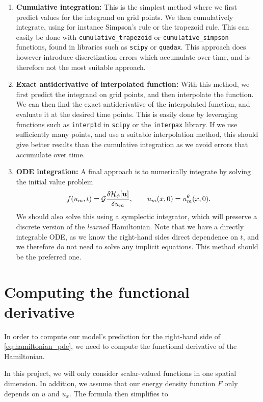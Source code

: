 \begin{enumerate}
    \item \textbf{Cumulative integration:} This is the simplest method where we first predict values for the integrand on grid points. 
    We then cumulatively integrate, using for instance Simpson's rule or the trapezoid rule. This can easily be done with \texttt{cumulative\_trapezoid} or \texttt{cumulative\_simpson} functions,
    found in libraries such as \texttt{scipy} or \texttt{quadax}. This approach does however introduce discretization errors which accumulate over time, and is therefore not the most suitable approach.
    \item \textbf{Exact antiderivative of interpolated function:} With this method, we first predict the integrand on grid points, and then interpolate the function.
    We can then find the exact antiderivative of the interpolated function, and evaluate it at the desired time points. This is easily done by leveraging functions such as \texttt{interp1d} in \texttt{scipy} or
    the \texttt{interpax} library. If we use sufficiently many points, and use a suitable interpolation method, this should give better results than the cumulative integration as we avoid errors that accumulate over time.
    \item \textbf{ODE integration:} A final approach is to numerically integrate by solving the initial value problem
    \[f(u_m, t) = \mathcal{G} \frac{\delta \mathcal{H}_\phi[\bm{u}]}{\delta u_m}, \qquad u_m(x, 0) =  u_m^\theta(x,0).\]
    We should also solve this using a symplectic integrator, which will preserve a discrete version of the \textit{learned} Hamiltonian.
    Note that we have a directly integrable ODE, as we know the right-hand sides direct dependence on \(t\), and we therefore do not need to solve any implicit equations.
    This method should be the preferred one.
\end{enumerate}

\section{Computing the functional derivative}

In order to compute our model's prediction for the right-hand side of \cref{eq:hamiltonian_pde}, we need to compute the functional derivative of the Hamiltonian.


In this project, we will only consider scalar-valued functions in one spatial dimension. 
In addition, we assume that our energy density function \(F\) only depends on \(u\) and \(u_x\). The formula then simplifies to

